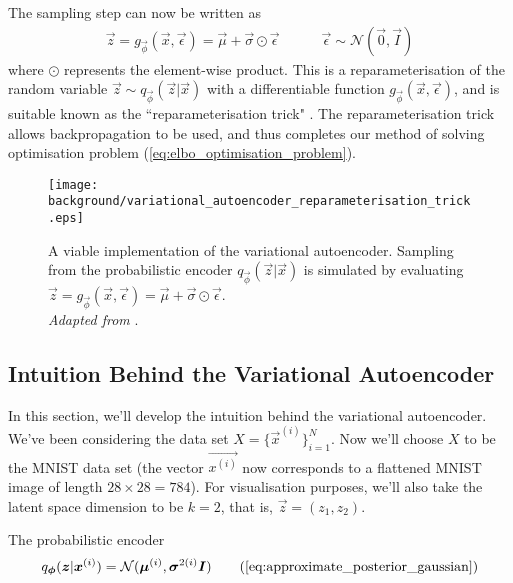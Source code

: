 The sampling step can now be written as
\begin{align}
\vec{z} = g_{\vec{\phi}}(\vec{x}, \vec{\epsilon}) = \vec{\mu} + \vec{\sigma} \odot \vec{\epsilon} \quad\quad\quad \vec{\epsilon} \sim \mathcal{N}(\vec{0}, \vec{I})
\label{eq:reparameterisation_trick}
\end{align}
where $\odot$ represents the element-wise product. This is a reparameterisation of the random variable $\vec{z}\sim q_{\vec{\phi}}(\vec{z}|\vec{x})$ with a differentiable function $g_{\vec{\phi}}(\vec{x}, \vec{\epsilon})$, and is suitable known as the ``reparameterisation trick" \cite{Kingma2014}. The reparameterisation trick allows backpropagation to be used, and thus completes our method of solving optimisation problem (\ref{eq:elbo_optimisation_problem}).\\

\begin{figure}[h!]
\centering
\captionsetup{justification=centering}
\texttt{[image: background/variational\_autoencoder\_reparameterisation\_trick.eps]}
\caption{A viable implementation of the variational autoencoder. Sampling from the probabilistic encoder $q_{\vec{\phi}}(\vec{z} | \vec{x})$ is simulated by evaluating $\vec{z} = g_{\vec{\phi}}(\vec{x}, \vec{\epsilon}) = \vec{\mu} + \vec{\sigma} \odot \vec{\epsilon}$.\\ \textit{Adapted from} \cite{Li2016}.}
\label{fig:variational_autoencoder_reparameterisation_trick}
\end{figure}

\newpage
\subsection{Intuition Behind the Variational Autoencoder}
In this section, we'll develop the intuition behind the variational autoencoder. We've been considering the data set $X = \{ \vec{x}^{(i)} \}_{i=1}^{N}$. Now we'll choose $X$ to be the MNIST data set (the vector $\vec{x^{(i)}}$ now corresponds to a flattened MNIST image of length $28\times 28 = 784$). For visualisation purposes, we'll also take the latent space dimension to be $k = 2$, that is, $\vec{z} = (z_1, z_2)$.

The probabilistic encoder
\begin{align}
q_{\vec{\phi}}(\vec{z} | \vec{x}^{(i)}) = \mathcal{N}(\vec{\mu}^{(i)}, \vec{\sigma}^{2(i)}\vec{I})
\tag{\ref{eq:approximate_posterior_gaussian}}
\end{align}


